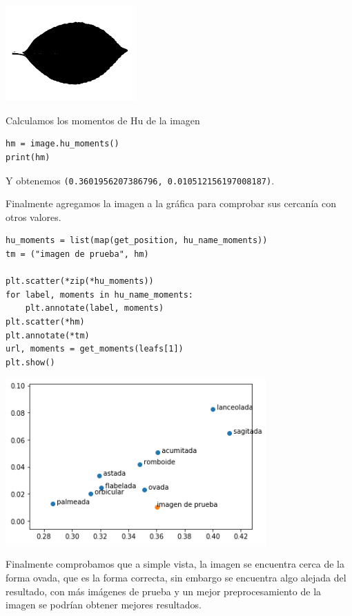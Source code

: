 \documentclass[letter]{article}
\begin{document}
\begin{center}
\includegraphics[width=5cm]{./images/testbin.png}
\end{center}

Calculamos los momentos de Hu de la imagen

\begin{verbatim}
hm = image.hu_moments()
print(hm)
\end{verbatim}

Y obtenemos \texttt{(0.3601956207386796, 0.010512156197008187)}.

Finalmente agregamos la imagen a la gráfica para comprobar sus cercanía con
otros valores.

\begin{verbatim}
hu_moments = list(map(get_position, hu_name_moments))
tm = ("imagen de prueba", hm)

plt.scatter(*zip(*hu_moments))
for label, moments in hu_name_moments:
    plt.annotate(label, moments)
plt.scatter(*hm)
plt.annotate(*tm)
url, moments = get_moments(leafs[1])
plt.show()
\end{verbatim}

\begin{center}
\includegraphics[width=10cm]{./images/result.png}
\end{center}

Finalmente comprobamos que a simple vista, la imagen se encuentra cerca de la
forma ovada, que es la forma correcta, sin embargo se encuentra algo alejada del
resultado, con más imágenes de prueba y un mejor preprocesamiento de la imagen
se podrían obtener mejores resultados.
\end{document}
